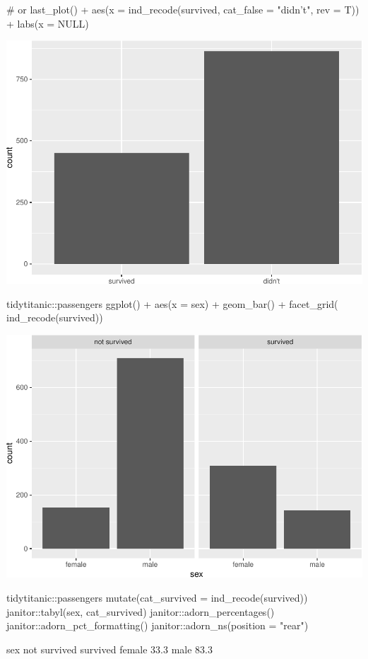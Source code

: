 \begin{Schunk}
\begin{Sinput}
# or
last_plot() +
  aes(x = ind_recode(survived, cat_false = "didn't", rev = T)) + 
  labs(x = NULL)
\end{Sinput}

\includegraphics[width=0.69\linewidth]{r_journal_files/figure-latex/visual_ind2cat_improves_cat_false_rev-1} \end{Schunk}

\begin{Schunk}
\begin{Sinput}
tidytitanic::passengers %
ggplot() + 
  aes(x = sex) + 
  geom_bar() + 
  facet_grid(~ ind_recode(survived))
\end{Sinput}

\includegraphics[width=0.69\linewidth]{r_journal_files/figure-latex/visual_ind2cat_preserves-1} \end{Schunk}

\begin{Schunk}
\begin{Sinput}
tidytitanic::passengers %
  mutate(cat_survived = ind_recode(survived)) %
  janitor::tabyl(sex, cat_survived) %
  janitor::adorn_percentages() %
  janitor::adorn_pct_formatting() %
  janitor::adorn_ns(position = "rear")
\end{Sinput}
\begin{Soutput}
         sex not survived    survived
      female  33.3%
        male  83.3%
\end{Soutput}
\end{Schunk}

